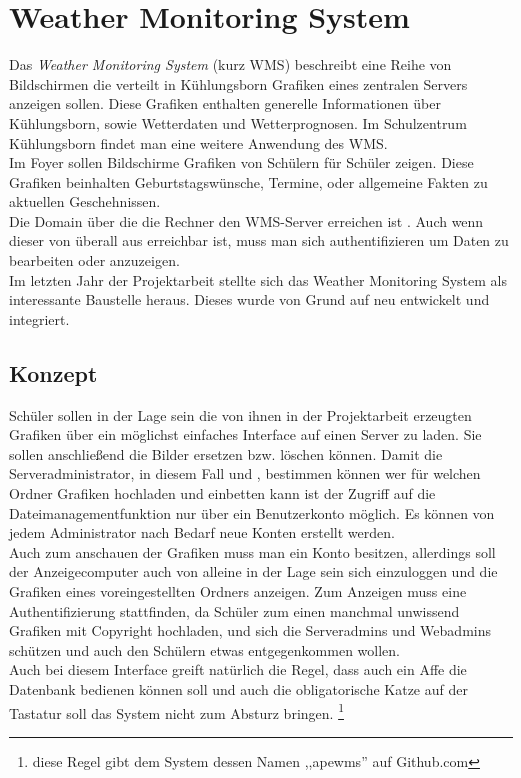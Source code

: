 \section{Weather Monitoring System}
Das \textit{Weather Monitoring System} (kurz WMS) beschreibt eine Reihe von Bildschirmen die verteilt in Kühlungsborn Grafiken eines zentralen Servers anzeigen sollen.
Diese Grafiken enthalten generelle Informationen über Kühlungsborn,
sowie Wetterdaten und Wetterprognosen.
Im Schulzentrum Kühlungsborn findet man eine weitere Anwendung des WMS. \\
Im Foyer sollen Bildschirme Grafiken von Schülern für Schüler zeigen.
Diese Grafiken beinhalten Geburtstagswünsche, Termine, oder allgemeine Fakten zu aktuellen Geschehnissen. \\
Die Domain über die die Rechner den WMS-Server erreichen ist .
Auch wenn dieser von überall aus erreichbar ist,
muss man sich authentifizieren um Daten zu bearbeiten oder anzuzeigen.\\
Im letzten Jahr der Projektarbeit stellte sich das Weather Monitoring System als
interessante Baustelle heraus. Dieses wurde von Grund auf neu entwickelt und integriert.

\subsection{Konzept} %
Schüler sollen in der Lage sein die von ihnen in der Projektarbeit erzeugten Grafiken über ein möglichst einfaches Interface auf einen Server zu laden.
Sie sollen anschließend die Bilder ersetzen bzw. löschen können.
Damit die Serveradministrator, in diesem Fall \mb und \re ,
bestimmen können wer für welchen Ordner Grafiken hochladen und einbetten kann ist der Zugriff auf die Dateimanagementfunktion nur über ein Benutzerkonto möglich.
Es können von jedem Administrator nach Bedarf neue Konten erstellt werden. \\
Auch zum anschauen der Grafiken muss man ein Konto besitzen,
allerdings soll der Anzeigecomputer auch von alleine in der Lage sein sich einzuloggen und die Grafiken eines voreingestellten Ordners anzeigen.
Zum Anzeigen muss eine Authentifizierung stattfinden,
da Schüler zum einen manchmal unwissend Grafiken mit Copyright hochladen,
und sich die Serveradmins und Webadmins schützen und auch den
Schülern etwas entgegenkommen wollen. \\
Auch bei diesem Interface greift natürlich die Regel,
dass auch ein Affe die Datenbank bedienen können soll
und auch die obligatorische Katze auf der Tastatur soll das
System nicht zum Absturz bringen. \footnote{diese Regel gibt dem System
dessen Namen ,,apewms'' auf Github.com}

